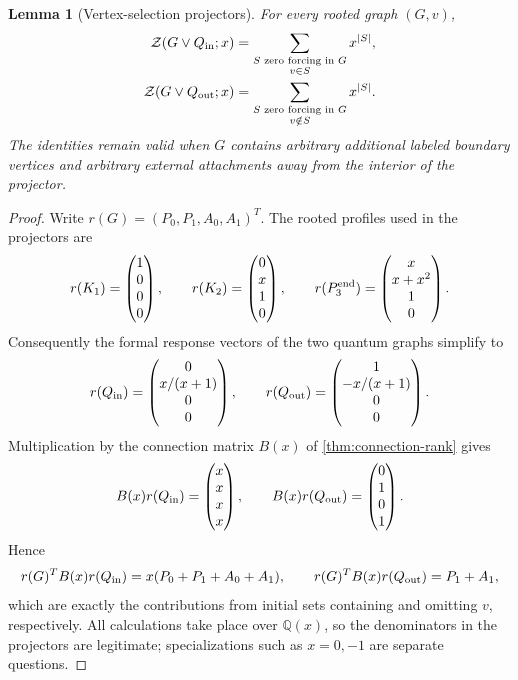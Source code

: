 \documentclass[11pt,reqno]{amsart}
\newtheorem{lemma}[lemma]{Lemma}
\theoremstyle{definition}
\newcommand{\Zpoly}{\mathcal Z}
\begin{document}
\begin{lemma}[Vertex-selection projectors]\label{lem:selection-projectors}
For every rooted graph $(G,v)$,
\begin{align*}
 \Zpoly(G\vee Q_{\rm in};x)
 &=\sum_{\substack{S\text{ zero forcing in }G\\v\in S}}x^{|S|},\\
 \Zpoly(G\vee Q_{\rm out};x)
 &=\sum_{\substack{S\text{ zero forcing in }G\\v\notin S}}x^{|S|}.
\end{align*}
The identities remain valid when $G$ contains arbitrary additional labeled
boundary vertices and arbitrary external attachments away from the interior of
the projector.
\end{lemma}

\begin{proof}
Write $r(G)=(P_0,P_1,A_0,A_1)^T$.  The rooted profiles used in the projectors
are
\[
 r(K_1)=\begin{pmatrix}1\\0\\0\\0\end{pmatrix},\qquad
 r(K_2)=\begin{pmatrix}0\\x\\1\\0\end{pmatrix},\qquad
 r(P_3^{\rm end})=\begin{pmatrix}x\\x+x^2\\1\\0\end{pmatrix}.
\]
Consequently the formal response vectors of the two quantum graphs simplify to
\[
 r(Q_{\rm in})=
 \begin{pmatrix}0\\x/(x+1)\\0\\0\end{pmatrix},
 \qquad
 r(Q_{\rm out})=
 \begin{pmatrix}1\\-x/(x+1)\\0\\0\end{pmatrix}.
\]
Multiplication by the connection matrix $B(x)$ of
\cref{thm:connection-rank} gives
\[
 B(x)r(Q_{\rm in})=
 \begin{pmatrix}x\\x\\x\\x\end{pmatrix},
 \qquad
 B(x)r(Q_{\rm out})=
 \begin{pmatrix}0\\1\\0\\1\end{pmatrix}.
\]
Hence
\[
 r(G)^TB(x)r(Q_{\rm in})=x(P_0+P_1+A_0+A_1),
 \qquad
 r(G)^TB(x)r(Q_{\rm out})=P_1+A_1,
\]
which are exactly the contributions from initial sets containing and omitting
$v$, respectively.  All calculations take place over $\mathbb Q(x)$, so the
denominators in the projectors are legitimate; specializations such as
$x=0,-1$ are separate questions.


\end{proof}
\end{document}
